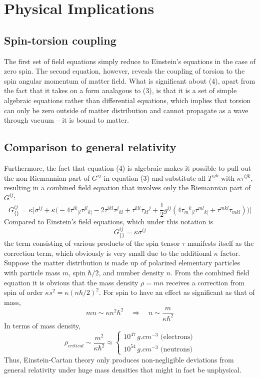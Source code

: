 \documentclass[12pt]{article}
\begin{document}
\section{Physical Implications}
\subsection{Spin-torsion coupling}
The first set of field equations simply reduce to Einstein's equations in the case of zero spin. The second equation, however, reveals the coupling of torsion to the spin angular momentum of matter field. What is significant about (4), apart from the fact that it takes on a form analagous to (3), is that it is a set of simple algebraic equations rather than differential equations, which implies that torsion can only be zero outside of matter distribution and cannot propagate as a wave through vacuum -- it is bound to matter.
\subsection{Comparison to general relativity}
Furthermore, the fact that equation (4) is algebraic makes it possible to pull out the non-Riemannian part of $G^{ij}$ in equation (3) and substitute all $T^{ijk}$ with $\kappa\tau^{ijk}$, resulting in a combined field equation that involves only the Riemannian part of $G^{ij}$\cite{hehl1976general}:
\[ G^{ij}_{\{\}}  = \kappa \Bigg[\sigma^{ij} + \kappa\Big( -4\tau^{ik}{}_{[l}\tau^{jl}{}_{k]} 
-2\tau^{ikl}\tau^j{}_{kl} + \tau^{kli}\tau_{kl}{}^j + \frac{1}{2}g^{ij}\left( 4\tau_m{}^k{}_{[l}\tau^{ml}{}_{k]} + \tau^{mkl}\tau_{mkl} \right)\Big) \Bigg] \]
Compared to Einstein's field equations, which under this notation is
\[G^{ij}_{\{\}} = \kappa \sigma^{ij} \]
the term consisting of various products of the spin tensor $\tau$ manifests itself as the correction term, which obviously is very small due to the additional $\kappa$ factor. Suppose the matter distribution is made up of polarized elementary particles with particle mass $m$, spin $\hbar/2$, and number density $n$. From the combined field equation it is obvious that the mass density $\rho = mn$ receives a correction from spin of order $\kappa s^2 = \kappa (n\hbar/2)^2$. For spin to have an effect as significant as that of mass,
\[ mn \sim \kappa n^2\hbar^2 \quad\Rightarrow\quad n \sim \frac{m}{\kappa \hbar^2} \]
In terms of mass density\cite{hehl1976general},
\[ \rho_{critical} \sim \frac{m^2}{\kappa \hbar^2} \approx \begin{cases}
10^{47} \, \si{g.cm^{-3}} \text{ (electrons)} \\
10^{54} \,\si{g.cm^{-3}} \text{ (neutrons)}
\end{cases}\]
Thus, Einstein-Cartan theory only produces non-negligible deviations from general relativity under huge mass densities that might in fact be unphysical. 

{}

\end{document}
